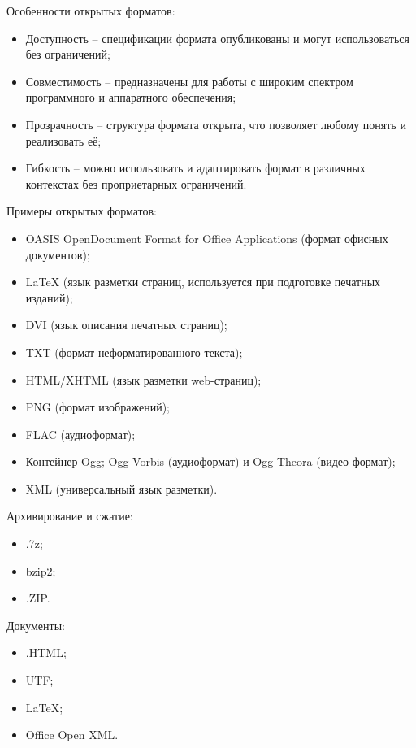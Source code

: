 \documentclass{ou}
\begin{document}
Особенности открытых форматов:
\begin{itemize}[label=-, leftmargin=0em, itemindent=3.35em, nosep]
\item Доступность -- спецификации формата опубликованы и могут использоваться без ограничений;
\item Совместимость -- предназначены для работы с широким спектром программного и аппаратного обеспечения;
\item Прозрачность -- структура формата открыта, что позволяет любому понять и реализовать её;
\item Гибкость -- можно использовать и адаптировать формат в различных контекстах без проприетарных ограничений.
\end{itemize}

Примеры открытых форматов:
\begin{itemize}[label=-, leftmargin=0em, itemindent=3.35em, nosep]
\item OASIS OpenDocument Format for Office Applications (формат офисных документов);
\item LaTeX (язык разметки страниц, используется при подготовке печатных изданий);
\item DVI (язык описания печатных страниц);
\item TXT (формат неформатированного текста);
\item HTML/XHTML (язык разметки web-страниц);
\item PNG (формат изображений);
\item FLAC (аудиоформат);
\item Контейнер Ogg; Ogg Vorbis (аудиоформат) и Ogg Theora (видео формат);
\item XML (универсальный язык разметки).
\end{itemize}

Архивирование и сжатие:
\begin{itemize}[label=-, leftmargin=0em, itemindent=3.35em, nosep]
\item .7z;
\item bzip2;
\item .ZIP.
\end{itemize}

Документы:
\begin{itemize}[label=-, leftmargin=0em, itemindent=3.35em, nosep]
\item .HTML;
\item UTF;
\item LaTeX;
\item Office Open XML.
\end{itemize}
\end{document}
